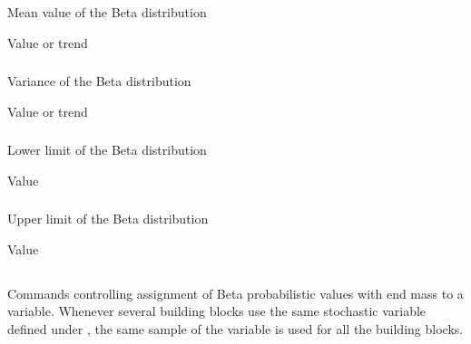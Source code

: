 {\subsubsection{}
 \slist
   \item \Description Mean value of the Beta distribution
   \item \Argument Value or trend
   \item \Default 
 \elist

\subsubsection{}
 \slist
   \item \Description Variance of the Beta distribution
   \item \Argument Value or trend
   \item \Default 
 \elist

\subsubsection{}
 \slist
   \item \Description Lower limit of the Beta distribution
   \item \Argument Value
   \item {}
 \elist

\subsubsection{}
 \slist
   \item \Description Upper limit of the Beta distribution
   \item \Argument Value
   \item {}
 \elist

\subsection{}
 \slist
   \item \Description Commands controlling assignment of Beta probabilistic values with end mass to a variable. Whenever several building blocks use the same stochastic variable defined under , the same sample of the variable is used for all the building blocks. 
   \item \Argument
   \item \Default 
 \elist

}
